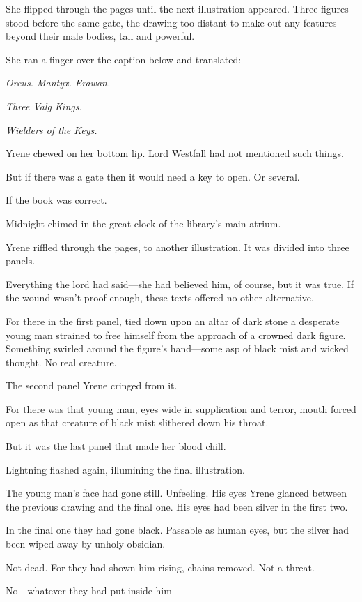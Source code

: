 She flipped through the pages until the next illustration appeared. Three figures stood before the same gate, the drawing too distant to make out any features beyond their male bodies, tall and powerful.

She ran a finger over the caption below and translated:

\emph{Orcus. Mantyx. Erawan.}

\emph{Three Valg Kings.}

\emph{Wielders of the Keys.}

Yrene chewed on her bottom lip. Lord Westfall had not mentioned such things.

But if there was a gate  then it would need a key to open. Or several.

If the book was correct.

Midnight chimed in the great clock of the library's main atrium.

Yrene riffled through the pages, to another illustration. It was divided into three panels.

Everything the lord had said---she had believed him, of course, but
 it was true. If the wound wasn't proof enough, these texts offered no other alternative.

For there in the first panel, tied down upon an altar of dark stone
 a desperate young man strained to free himself from the approach of a crowned dark figure. Something swirled around the figure's hand---some asp of black mist and wicked thought. No real creature.

The second panel  Yrene cringed from it.

For there was that young man, eyes wide in supplication and terror, mouth forced open as that creature of black mist slithered down his throat.

But it was the last panel that made her blood chill.

Lightning flashed again, illumining the final illustration.

The young man's face had gone still. Unfeeling. His eyes  Yrene glanced between the previous drawing and the final one. His eyes had been silver in the first two.

In the final one  they had gone black. Passable as human eyes, but the silver had been wiped away by unholy obsidian.

Not dead. For they had shown him rising, chains removed. Not a threat.

No---whatever they had put inside him 

